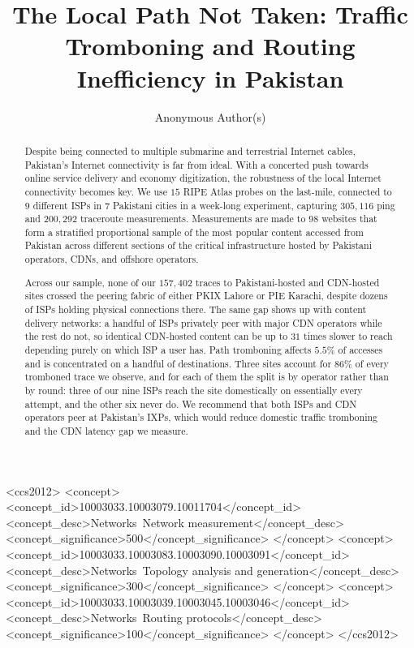\documentclass[sigconf,anonymous,10pt]{acmart}
\begin{document}
\title{The Local Path Not Taken: Traffic Tromboning and Routing Inefficiency in Pakistan}

\author{Anonymous Author(s)}

\renewcommand{\shortauthors}{Anonymous et al.}

\begin{abstract}
Despite being connected to multiple submarine and terrestrial Internet cables, Pakistan's Internet connectivity is far from ideal. With a concerted push towards online service delivery and economy digitization, the robustness of the local Internet connectivity becomes key. We use $15$ RIPE Atlas probes on the last-mile, connected to $9$ different ISPs in $7$ Pakistani cities in a week-long experiment, capturing $305,116$ ping and $200,292$ traceroute measurements. Measurements are made to $98$ websites that form a stratified proportional sample of the most popular content accessed from Pakistan across different sections of the critical infrastructure hosted by Pakistani operators, CDNs, and offshore operators.  

Across our sample, none of our $157{,}402$ traces to Pakistani-hosted and CDN-hosted sites crossed the peering fabric of either PKIX Lahore or PIE Karachi, despite dozens of ISPs holding physical connections there. The same gap shows up with content delivery networks: a handful of ISPs privately peer with major CDN operators while the rest do not, so identical CDN-hosted content can be up to $31$ times slower to reach depending purely on which ISP a user has. Path tromboning affects $5.5\%$ of accesses and is concentrated on a handful of destinations. Three sites account for $86\%$ of every tromboned trace we observe, and for each of them the split is by operator rather than by round: three of our nine ISPs reach the site domestically on essentially every attempt, and the other six never do. We recommend that both ISPs and CDN operators peer at Pakistan's IXPs, which would reduce domestic traffic tromboning and the CDN latency gap we measure.


\end{abstract}

\begin{CCSXML}
<ccs2012>
<concept>
<concept_id>10003033.10003079.10011704</concept_id>
<concept_desc>Networks~Network measurement</concept_desc>
<concept_significance>500</concept_significance>
</concept>
<concept>
<concept_id>10003033.10003083.10003090.10003091</concept_id>
<concept_desc>Networks~Topology analysis and generation</concept_desc>
<concept_significance>300</concept_significance>
</concept>
<concept>
<concept_id>10003033.10003039.10003045.10003046</concept_id>
<concept_desc>Networks~Routing protocols</concept_desc>
<concept_significance>100</concept_significance>
</concept>
</ccs2012>
\end{CCSXML}
\end{document}
